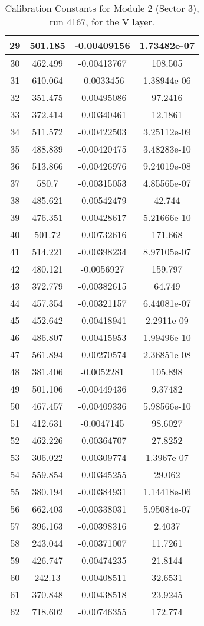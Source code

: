 \begin{table}[h]
{\begin{tabular}{|c|c|c|c|}
29	&	501.185	&	-0.00409156	&	1.73482e-07	\\	\hline
30	&	462.499	&	-0.00413767	&	108.505	\\	\hline
31	&	610.064	&	-0.0033456	&	1.38944e-06	\\	\hline
32	&	351.475	&	-0.00495086	&	97.2416	\\	\hline
33	&	372.414	&	-0.00340461	&	12.1861	\\	\hline
34	&	511.572	&	-0.00422503	&	3.25112e-09	\\	\hline
35	&	488.839	&	-0.00420475	&	3.48283e-10	\\	\hline
36	&	513.866	&	-0.00426976	&	9.24019e-08	\\	\hline
37	&	580.7	&	-0.00315053	&	4.85565e-07	\\	\hline
38	&	485.621	&	-0.00542479	&	42.744	\\	\hline
39	&	476.351	&	-0.00428617	&	5.21666e-10	\\	\hline
40	&	501.72	&	-0.00732616	&	171.668	\\	\hline
41	&	514.221	&	-0.00398234	&	8.97105e-07	\\	\hline
42	&	480.121	&	-0.0056927	&	159.797	\\	\hline
43	&	372.779	&	-0.00382615	&	64.749	\\	\hline
44	&	457.354	&	-0.00321157	&	6.44081e-07	\\	\hline
45	&	452.642	&	-0.00418941	&	2.2911e-09	\\	\hline
46	&	486.807	&	-0.00415953	&	1.99496e-10	\\	\hline
47	&	561.894	&	-0.00270574	&	2.36851e-08	\\	\hline
48	&	381.406	&	-0.0052281	&	105.898	\\	\hline
49	&	501.106	&	-0.00449436	&	9.37482	\\	\hline
50	&	467.457	&	-0.00409336	&	5.98566e-10	\\	\hline
51	&	412.631	&	-0.0047145	&	98.6027	\\	\hline
52	&	462.226	&	-0.00364707	&	27.8252	\\	\hline
53	&	306.022	&	-0.00309774	&	1.3967e-07	\\	\hline
54	&	559.854	&	-0.00345255	&	29.062	\\	\hline
55	&	380.194	&	-0.00384931	&	1.14418e-06	\\	\hline
56	&	662.403	&	-0.00338031	&	5.95084e-07	\\	\hline
57	&	396.163	&	-0.00398316	&	2.4037	\\	\hline
58	&	243.044	&	-0.00371007	&	11.7261	\\	\hline
59	&	426.747	&	-0.00474235	&	21.8144	\\	\hline
60	&	242.13	&	-0.00408511	&	32.6531	\\	\hline
61	&	370.848	&	-0.00438518	&	23.9245	\\	\hline
62	&	718.602	&	-0.00746355	&	172.774	\\	\hline
  \end{tabular}
        }
        \caption{Calibration Constants for Module 2 (Sector 3), run 4167, for the V layer.}
\end{table}


